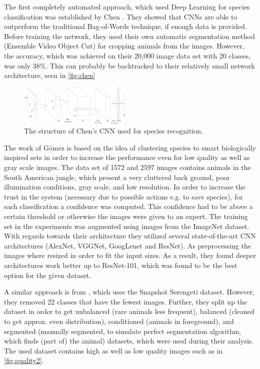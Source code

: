 \documentclass[electronic]{vgtc}             %
\begin{document}
	The first completely automated approach, which used Deep Learning for species classification was established by Chen \cite{Chen:2014}. 
	They showed that CNNs are able to outperform the traditional Bag-of-Words technique, if enough data is provided. 
	Before training the network, they used their own automatic segmentation method (Ensemble Video Object Cut) for cropping  animals from the images.
	However, the accuracy, which was achieved on their 20,000 image data set with 20 classes, was only 38\%. 
	This can probably be backtracked to their relatively small network architecture, seen in \autoref{fig:chen}
	
	\begin{figure}[htbp]
		\includegraphics[width=0.48\textwidth]{Chen}
		\caption{The structure of Chen's CNN used for species recognition.\cite{Chen:2014}}
		\label{fig:chen}
	\end{figure}
	
	The work of G\'omez \cite{Gomez:2016:Low} is based on the idea of clustering species to smart biologically inspired sets in order to increase the performance even for low quality as well as gray scale images.
	The data set of 1572 and 2597 images contains animals in the South American jungle, which present a very cluttered back	ground, poor illumination conditions, gray scale, and low resolution.
	In order to increase the trust in the system (necessary due to possible actions e.g. to save species), for each classification a confidence was computed.
	This confidence had to be above a certain threshold or otherwise the images were given to an expert.
	The	training set in the experiments was augmented using images from the ImageNet dataset.
	With regards towards their architecture they utilized several state-of-the-art CNN architectures (AlexNet, VGGNet, GoogLenet and ResNet).
	As preprocessing the images where resized in order to fit the input sizes.
	As a result, they found deeper architectures work better up to ResNet-101, which was found to be the best option for the given dataset. 
	
	A similar approach is from \cite{Gomez:2016}, which uses the Snapshot Serengeti dataset. 
	However, they removed 22 classes that have the fewest images.
	Further, they split up the dataset in order to get unbalanced (rare animals less frequent), balanced (cleaned to get approx. even distribution), conditioned (animals in foreground), and segmented (manually segmented, to simulate perfect segmentation algorithm, which finds (part of) the animal) datasets, which were used during their analysis.
	The used dataset contains high as well as low quality images such as in \autoref{fig:quality2}. 
		
\end{document}
